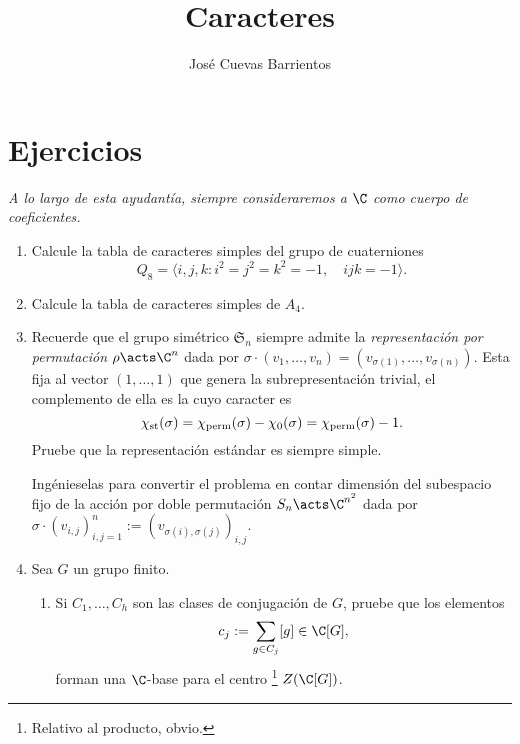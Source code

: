 \documentclass[11pt, reqno]{amsart}
\title{Caracteres}
\date{\DTMdate{2025-10-01}}
\author{José Cuevas Barrientos}
\begin{document}
\maketitle

\section{Ejercicios}
\begin{center}
	\slshape
	A lo largo de esta ayudantía, siempre consideraremos a $\C$ como cuerpo de coeficientes.
\end{center}
\begin{enumerate}
	\item Calcule la tabla de caracteres simples del grupo de cuaterniones
		\[
			Q_8 = \langle i, j, k : i^2 = j^2 = k^2 = -1, \quad ijk = -1 \rangle.
		\]

		\newex
	\item Calcule la tabla de caracteres simples de $A_4$.

		\newex
	\item\lookright Recuerde que el grupo simétrico $\mathfrak{S}_n$ siempre admite la \emph{representación por permutación} $\rho \acts
		\C^n$ dada por $\sigma \cdot (v_1, \dots, v_n) = (v_{\sigma(1)}, \dots, v_{\sigma(n)})$.
		Esta fija al vector $(1, \dots, 1)$ que genera la subrepresentación trivial, el complemento de ella es la
		 cuyo caracter es
		\[
			\chi_{\rm st}(\sigma) = \chi_{\rm perm}(\sigma) - \chi_0(\sigma) = \chi_{\rm perm}(\sigma) - 1.
		\]
		Pruebe que la representación estándar es siempre simple.
		\begin{hint}
			Ingénieselas para convertir el problema en contar dimensión del subespacio fijo de la acción por doble permutación
			$S_n \acts \C^{n^2}$ dada por $\sigma\cdot(v_{i,j})_{i,j=1}^n := (v_{\sigma(i), \sigma(j)})_{i,j}$.
		\end{hint}

		\newex
	\item\label{ex:degree_divides_order}
		Sea $G$ un grupo finito.
		\begin{enumerate}
			\item Si $C_1, \dots, C_h$ son las clases de conjugación de $G$, pruebe que los elementos
				\[
					c_j := \sum_{g\in C_j} [g] \in \C[G],
				\]
				forman una $\C$-base para el centro%
				\footnote{Relativo al producto, obvio.}
				$Z(\C[G])$.


\end{enumerate}
\end{enumerate}
\end{document}
